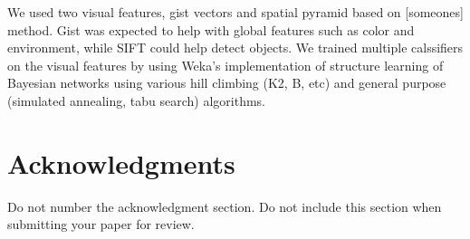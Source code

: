 \documentclass[12pt]{article}
\begin{document}
We used two visual features, gist vectors and spatial pyramid based on
[someones] method. Gist was expected to help with global features such as
color and environment, while SIFT could help detect objects. We trained multiple
calssifiers on the visual features by using Weka's implementation of structure
learning of Bayesian networks using various hill climbing (K2, B, etc) and
general purpose (simulated annealing, tabu search) algorithms.


\section*{Acknowledgments}

Do not number the acknowledgment section. Do not include this section
when submitting your paper for review.


\end{document}
